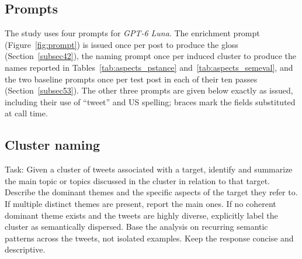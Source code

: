 \documentclass[pdflatex,sn-mathphys-num,iicol]{sn-jnl}%
\begin{document}

\begin{appendices}

\section{Prompts}\label{secA1}

The study uses four prompts for \textit{GPT-6 Luna}. The enrichment prompt (Figure~\ref{fig:prompt}) is issued once per post to produce the gloss (Section~\ref{subsec42}), the naming prompt once per induced cluster to produce the names reported in Tables~\ref{tab:aspects_pstance} and~\ref{tab:aspects_semeval}, and the two baseline prompts once per test post in each of their ten passes (Section~\ref{subsec53}). The other three prompts are given below exactly as issued, including their use of ``tweet'' and US spelling; braces mark the fields substituted at call time.

\subsection{Cluster naming}\label{secA11}
\begin{tcolorbox}[colframe=snrule, colback=snbox, boxrule=0.6pt, arc=3pt, width=\linewidth, left=5pt, right=5pt, top=4pt, bottom=4pt]
	\footnotesize\ttfamily\raggedright\setlength{\parindent}{0pt}\setlength{\parskip}{0.25\baselineskip}\noindent
	Task: Given a cluster of tweets associated with a target, identify and summarize the main topic or topics discussed in the cluster in relation to that target. Describe the dominant themes and the specific aspects of the target they refer to. If multiple distinct themes are present, report the main ones. If no coherent dominant theme exists and the tweets are highly diverse, explicitly label the cluster as semantically dispersed. Base the analysis on recurring semantic patterns across the tweets, not isolated examples. Keep the response concise and descriptive.


\end{tcolorbox}
\end{appendices}
\end{document}
